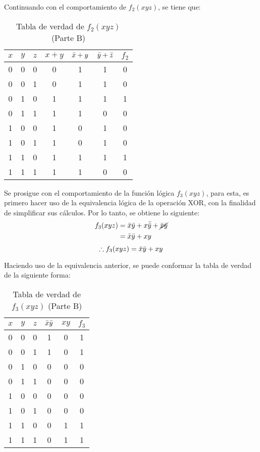 \documentclass[../procedimientos.tex]{subfiles}
\begin{document}
Continuando con el comportamiento de $f_2(xyz)$, se tiene que:
\begin{table}[H]
  \centering
  \begin{tabular}{ccc|ccc|c}
    \hline
    $x$ & $y$ & $z$ & $x+y$ & $\bar{x}+y$ & $\bar{y}+\bar{z}$ & $f_2$\\
    \hline
    0 & 0 & 0 & 0 & 1 & 1 & 0\\
    0 & 0 & 1 & 0 & 1 & 1 & 0\\
    0 & 1 & 0 & 1 & 1 & 1 & 1\\
    0 & 1 & 1 & 1 & 1 & 0 & 0\\
    1 & 0 & 0 & 1 & 0 & 1 & 0\\
    1 & 0 & 1 & 1 & 0 & 1 & 0\\
    1 & 1 & 0 & 1 & 1 & 1 & 1\\
    1 & 1 & 1 & 1 & 1 & 0 & 0\\
    \hline
  \end{tabular}
  \caption{Tabla de verdad de $f_2(xyz)$ (Parte B)}
  \label{tab:b_f2}
\end{table}

Se prosigue con el comportamiento de la función lógica $f_3(xyz)$, para esta, 
es primero hacer uso de la equivalencia lógica de la operación XOR, con la 
finalidad de simplificar sus cálculos. Por lo tanto, se obtiene lo siguiente:
\begin{align*}
  f_3(xyz) &= \bar{x}\bar{y} + x\bar{\bar{y}} + \cancel{\bar{x}\bar{y}}\\
  &= \bar{x}\bar{y} + xy
\end{align*}
$$\therefore{f_3(xyz) = \bar{x}\bar{y} + xy}$$

Haciendo uso de la equivalencia anterior, se puede conformar la tabla de 
verdad de la siguiente forma:
\begin{table}[H]
  \centering
  \begin{tabular}{ccc|cc|c}
    \hline
    $x$ & $y$ & $z$ & $\bar{x}\bar{y}$ & $xy$ & $f_3$\\
    \hline
    0 & 0 & 0 & 1 & 0 & 1\\
    0 & 0 & 1 & 1 & 0 & 1\\
    0 & 1 & 0 & 0 & 0 & 0\\
    0 & 1 & 1 & 0 & 0 & 0\\
    1 & 0 & 0 & 0 & 0 & 0\\
    1 & 0 & 1 & 0 & 0 & 0\\
    1 & 1 & 0 & 0 & 1 & 1\\
    1 & 1 & 1 & 0 & 1 & 1\\
    \hline
  \end{tabular}
  \caption{Tabla de verdad de $f_3(xyz)$ (Parte B)}
  \label{tab:b_f3}
\end{table}
\end{document}

